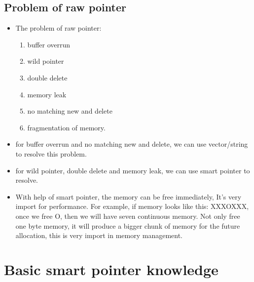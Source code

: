 \documentclass[a4paper,11pt,twoside]{book}
\begin{document}
\subsection{Problem of raw pointer}
\begin{itemize}
	\item The problem of raw pointer:
	\begin{enumerate}
		\item buffer overrun
		\item wild pointer
		\item double delete
		\item memory leak
		\item no matching new and delete
		\item fragmentation of memory.
	\end{enumerate}

	\item for buffer overrun and no matching new and delete, we can use vector/string to resolve this problem.
	
	\item for wild pointer, double delete and memory leak, we can use smart pointer to resolve. 
	
	\item With help of smart pointer, the memory can be free immediately, It's very import for performance. For example, if memory looks like this: XXXOXXX, once we free O, then we will have seven continuous memory. Not only free one byte memory, it will produce a bigger chunk of memory for the future allocation, this is very import in memory management. 
\end{itemize}

\section{Basic smart pointer knowledge}
\end{document}
